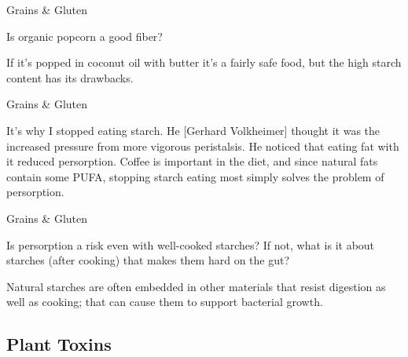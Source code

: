\documentclass[11pt,oneside,openany,extrafontsizes]{memoir}
\begin{document}
\begin{qaexchange}{Grains \& Gluten}

    \begin{question}
        Is organic popcorn a good fiber?
    \end{question}

    \begin{answer}
      If it's popped in coconut oil with butter it's a fairly safe food, but the high starch content has its drawbacks.
    \end{answer}
\end{qaexchange}

\begin{standalonequote}{Grains \& Gluten}

    \begin{answer}
       It's why I stopped eating starch. He [Gerhard Volkheimer] thought it was the increased pressure from more vigorous peristalsis. He noticed that eating fat with it reduced persorption. Coffee is important in the diet, and since natural fats contain some PUFA, stopping starch eating most simply solves the problem of persorption. 
    \end{answer}
\end{standalonequote}

\begin{qaexchange}{Grains \& Gluten}

    \begin{question}
        Is persorption a risk even with well-cooked starches? If not, what is it about starches (after cooking) that makes them hard on the gut?
    \end{question}

    \begin{answer}
      Natural starches are often embedded in other materials that resist digestion as well as cooking; that can cause them to support bacterial growth.
    \end{answer}
\end{qaexchange}

\subsection{Plant Toxins}
\end{document}

